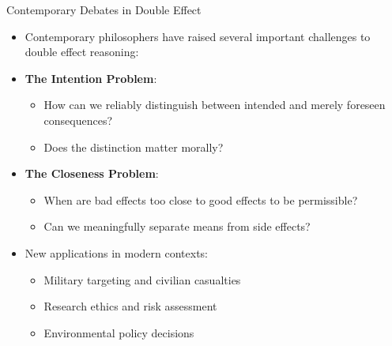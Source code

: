 \documentclass{beamer}
\begin{document}
\begin{frame}{Contemporary Debates in Double Effect}
    \begin{itemize}
        \item Contemporary philosophers have raised several important challenges to double effect reasoning:
        
        \item \textbf{The Intention Problem}:
            \begin{itemize}
                \item How can we reliably distinguish between intended and merely foreseen consequences?
                \item Does the distinction matter morally?
            \end{itemize}
        
        \item \textbf{The Closeness Problem}:
            \begin{itemize}
                \item When are bad effects too close to good effects to be permissible?
                \item Can we meaningfully separate means from side effects?
            \end{itemize}
        
        \item New applications in modern contexts:
            \begin{itemize}
                \item Military targeting and civilian casualties
                \item Research ethics and risk assessment
                \item Environmental policy decisions
            \end{itemize}
    \end{itemize}
\end{frame}
\end{document}
